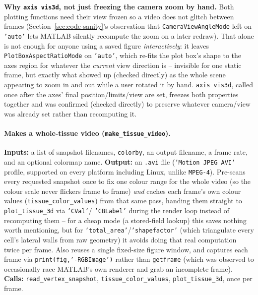 \documentclass[11pt,a4paper]{report}
\begin{document}
\begin{physbox}
\label{sec:vis3d-note}
\textbf{Why \texttt{axis vis3d}, not just freezing the camera zoom by
hand.} Both plotting functions need their view frozen so a video does
not glitch between frames (Section~\ref{sec:code-sanity}'s
observation that \texttt{CameraViewAngleMode} left on \texttt{'auto'}
lets MATLAB silently recompute the zoom on a later redraw). That alone
is not enough for anyone using a saved figure \emph{interactively}: it
leaves \texttt{PlotBoxAspectRatioMode} on \texttt{'auto'}, which
re-fits the plot box's shape to the axes region for whatever the
\emph{current} view direction is -- invisible for one static frame, but
exactly what showed up (checked directly) as the whole scene appearing
to zoom in and out while a user rotated it by hand. \texttt{axis
vis3d}, called once after the axes' final position/limits/view are
set, freezes both properties together and was confirmed (checked
directly) to preserve whatever camera/view was already set rather than
recomputing it.
\end{physbox}

\paragraph{Makes a whole-tissue video (\texttt{make\_tissue\_video}).}
\textbf{Inputs:} a list of snapshot filenames, \texttt{colorby}, an
output filename, a frame rate, and an optional colormap name.
\textbf{Output:} an \texttt{.avi} file (\texttt{'Motion JPEG AVI'}
profile, supported on every platform including Linux, unlike
\texttt{MPEG-4}). Pre-scans every requested snapshot once to fix one
colour range for the whole video (so the colour scale never flickers
frame to frame) \emph{and} caches each frame's own colour values
(\texttt{tissue\_color\_values}) from that same pass, handing them
straight to \texttt{plot\_tissue\_3d} via \texttt{'CVal'}/
\texttt{'CBLabel'} during the render loop instead of recomputing them
-- for a cheap mode (a stored-field lookup) this saves nothing worth
mentioning, but for \texttt{'total\_area'}/\texttt{'shapefactor'}
(which triangulate every cell's lateral walls from raw geometry) it
avoids doing that real computation twice per frame. Also reuses a
single fixed-size figure window, and captures each frame via
\texttt{print(fig,'-RGBImage')} rather than \texttt{getframe} (which
was observed to occasionally race MATLAB's own renderer and grab an
incomplete frame). \textbf{Calls:} \texttt{read\_vertex\_snapshot},
\texttt{tissue\_color\_values}, \texttt{plot\_tissue\_3d}, once per
frame.
\end{document}
